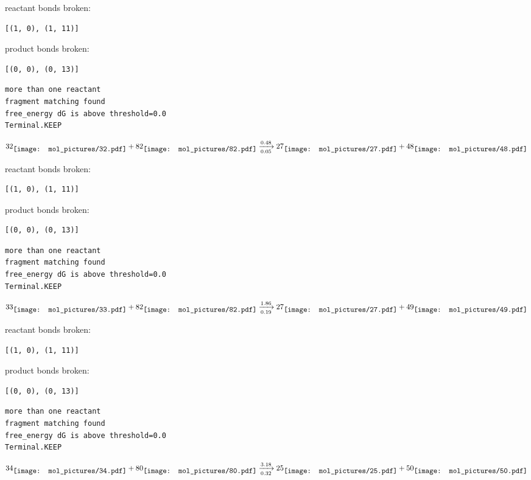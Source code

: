 \documentclass{article}
\begin{document}
reactant bonds broken:\begin{verbatim}
[(1, 0), (1, 11)]
\end{verbatim}
product bonds broken:\begin{verbatim}
[(0, 0), (0, 13)]
\end{verbatim}




\vspace{1cm}
\begin{verbatim}
more than one reactant
fragment matching found
free_energy dG is above threshold=0.0
Terminal.KEEP
\end{verbatim}
$$
32
\raisebox{-.5\height}{\texttt{[image: mol\_pictures/32.pdf]}}
+
82
\raisebox{-.5\height}{\texttt{[image: mol\_pictures/82.pdf]}}
\xrightarrow[0.05]{0.48}
27
\raisebox{-.5\height}{\texttt{[image: mol\_pictures/27.pdf]}}
+
48
\raisebox{-.5\height}{\texttt{[image: mol\_pictures/48.pdf]}}
$$


reactant bonds broken:\begin{verbatim}
[(1, 0), (1, 11)]
\end{verbatim}
product bonds broken:\begin{verbatim}
[(0, 0), (0, 13)]
\end{verbatim}




\vspace{1cm}
\begin{verbatim}
more than one reactant
fragment matching found
free_energy dG is above threshold=0.0
Terminal.KEEP
\end{verbatim}
$$
33
\raisebox{-.5\height}{\texttt{[image: mol\_pictures/33.pdf]}}
+
82
\raisebox{-.5\height}{\texttt{[image: mol\_pictures/82.pdf]}}
\xrightarrow[0.19]{1.86}
27
\raisebox{-.5\height}{\texttt{[image: mol\_pictures/27.pdf]}}
+
49
\raisebox{-.5\height}{\texttt{[image: mol\_pictures/49.pdf]}}
$$


reactant bonds broken:\begin{verbatim}
[(1, 0), (1, 11)]
\end{verbatim}
product bonds broken:\begin{verbatim}
[(0, 0), (0, 13)]
\end{verbatim}




\vspace{1cm}
\begin{verbatim}
more than one reactant
fragment matching found
free_energy dG is above threshold=0.0
Terminal.KEEP
\end{verbatim}
$$
34
\raisebox{-.5\height}{\texttt{[image: mol\_pictures/34.pdf]}}
+
80
\raisebox{-.5\height}{\texttt{[image: mol\_pictures/80.pdf]}}
\xrightarrow[0.32]{3.18}
25
\raisebox{-.5\height}{\texttt{[image: mol\_pictures/25.pdf]}}
+
50
\raisebox{-.5\height}{\texttt{[image: mol\_pictures/50.pdf]}}
$$
\end{document}
